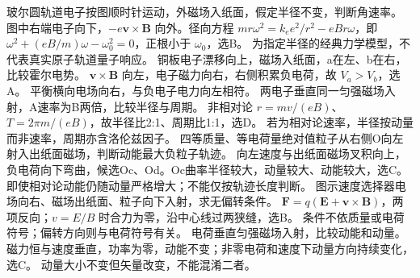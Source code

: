 \problemtext 玻尔圆轨道电子按图顺时针运动，外磁场入纸面，假定半径不变，判断角速率。
\workings 图中右端电子向下，$-e\bm v\times\bm B$ 向外。径向方程 $mr\omega^2=k_ee^2/r^2-eBr\omega$，即 $\omega^2+(eB/m)\omega-\omega_0^2=0$，正根小于 $\omega_0$，选B。
\crosscheck 为指定半径的经典力学模型，不代表真实原子轨道量子响应。
\problemtext 铜板电子漂移向上，磁场入纸面，a在左、b在右，比较霍尔电势。
\workings $\bm v\times\bm B$ 向左，电子磁力向右，右侧积累负电荷，故 $V_a>V_b$，选A。
\crosscheck 平衡横向电场向右，与负电子电力向左相符。
\problemtext 两电子垂直同一匀强磁场入射，A速率为B两倍，比较半径与周期。
\workings 非相对论 $r=mv/(eB)$、$T=2\pi m/(eB)$，故半径比2:1、周期比1:1，选D。
\crosscheck 若为相对论速率，半径按动量而非速率，周期亦含洛伦兹因子。
\problemtext 四等质量、等电荷量绝对值粒子从右侧O向左射入出纸面磁场，判断动能最大负粒子轨迹。
\workings 向左速度与出纸面磁场叉积向上，负电荷向下弯曲，候选Oc、Od。Oc曲率半径较大，动量较大、动能较大，选C。
\crosscheck 即使相对论动能仍随动量严格增大；不能仅按轨迹长度判断。
\problemtext 图示速度选择器电场向右、磁场出纸面、粒子向下入射，求无偏转条件。
\workings $\bm F=q(\bm E+\bm v\times\bm B)$，两项反向；$v=E/B$ 时合力为零，沿中心线过两狭缝，选B。
\crosscheck 条件不依质量或电荷符号；偏转方向则与电荷符号有关。
\problemtext 电荷垂直匀强磁场入射，比较动能和动量。
\workings 磁力恒与速度垂直，功率为零，动能不变；非零电荷和速度下动量方向持续变化，选C。
\crosscheck 动量大小不变但矢量改变，不能混淆二者。

